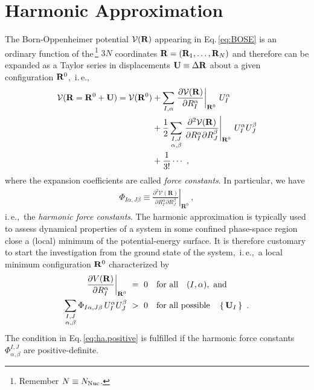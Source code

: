 \section{Harmonic Approximation}
The Born-Oppenheimer potential $\mathcal V ({\bf R})$ appearing in Eq.\,\eqref{eq:BOSE} is an ordinary function of the\,\footnote{Remember $N \equiv N_{\rm Nuc}$.} $3 N$ coordinates ${\bf R} = ({\bf R}_1, \ldots, {\bf R}_{N})$ and therefore can be expanded as a Taylor series in displacements ${\bf U} \equiv \Delta {\bf R}$ about a given configuration ${\bf R}^0$,~i.\,e.,
\begin{align}
\begin{split}
  \mathcal V ({\bf R} = {\bf R}^0 + {\bf U})
    = \mathcal V ({\bf R}^0)
    &+ \sum_{I, \alpha} 
      \left. \frac{\partial \mathcal V({\bf R})}{\partial R^\alpha_I} 
      \right\vert_{{\bf R}^0}
    \,U^\alpha_I
    \\
    &
    + \frac{1}{2}
    \sum_{\substack{I, J \\ \alpha, \beta}}
    \left.\frac{\partial^{2} \mathcal{V}(\mathbf{R})}{\partial R_{I}^{\alpha} \partial R_{J}^{\beta}}\right|_{\mathbf{R}^{0}}
    \, U_I^\alpha U_J^\beta
    \\
    &+\frac{1}{3!}\cdots ~,
\end{split}
\end{align}
where the expansion coefficients are called \emph{force constants}. In particular, we have
\begin{align}
  \Phi_{I \alpha, J \beta}
  \equiv \left.\frac{\partial^{2} \mathcal{V}(\mathbf{R})}{\partial R_{I}^{\alpha} \partial R_{J}^{\beta}}\right|_{\mathbf{R}^{0}}~,
  \label{eq:FC2}
\end{align}
i.\,e.,~the \emph{harmonic force constants}. The harmonic approximation is typically used to assess dynamical properties of a system in some confined phase-space region close a (local) minimum of the potential-energy surface. It is therefore customary to start the investigation from the ground state of the system,~i.\,e.,~a local minimum configuration ${\bf R}^0$ characterized by
\begin{align}
	\left. \frac{\partial V({\bf R})}{\partial R^\alpha_I} 
	\right\vert_{{\bf R}^0} 
		&~=~ 0 \quad\text{for all}\quad (I, \alpha),~\text{and} \\
	\sum_{\substack{I, J \\ \alpha, \beta}}
	\Phi_{I \alpha, J \beta}
	\, U_I^\alpha U_J^\beta
		&~>~ 0 \quad\text{for all possible}\quad \set{{\bf U}_I}~.
	\label{eq:ha.positive}
\end{align}
The condition in Eq.\,\eqref{eq:ha.positive} is fulfilled if the harmonic force constants $\Phi_{\alpha, \beta}^{I, J}$ are positive-definite.

